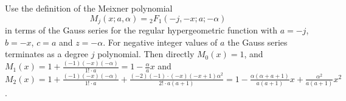 \documentclass[12pt]{article}
\begin{document}
\begin{solution}
    Use the definition of the Meixner polynomial
    \[
        M_j(x; a, \alpha) = {}_2F_1 \left( -j, -x; a; -\alpha \right)
    \] in terms of the Gauss series for the regular hypergeometric
    function with \( a = -j \), \( b = -x \), \( c = a \) and \( z = -\alpha
    \).  For negative integer values of \( a \) the Gauss series
    terminates as a degree \( j \) polynomial.  Then directly \( M_0(x)
    = 1 \), and \( M_1(x) = 1 + \frac{(-1)(-x)(-\alpha)}{1!  \cdot a} =
    1 - \frac{\alpha}{a} x \) and \( M_2(x) = 1 + \frac{(-1)(-x)(-\alpha)}
    {1!  \cdot a} + \frac{(-2)(-1) \cdot (-x)(-x+1) \alpha^2}{2!  \cdot
    a(a+1)} = 1 - \frac{\alpha (\alpha + a + 1)}{a (a+1)} x+ \frac{\alpha^2}
    {a(a+1)} x^{2} \).
\end{solution}
\end{document}
